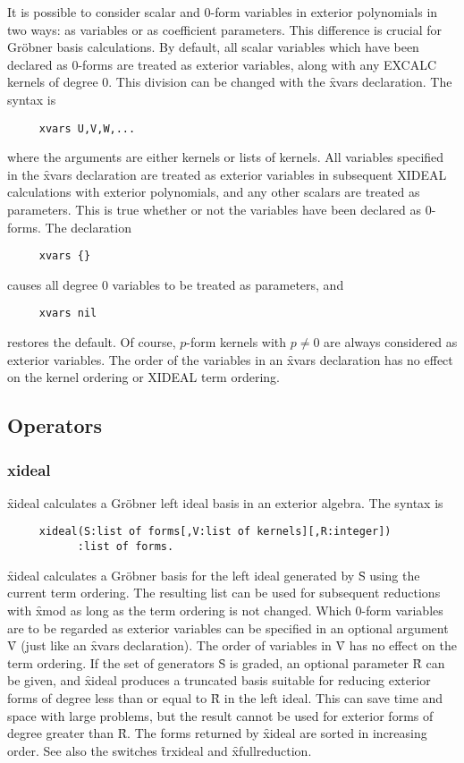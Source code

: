 It is possible to consider scalar and 0-form variables in exterior
polynomials in two ways: as variables or as coefficient parameters. This
difference is crucial for Gr{\"o}bner basis calculations. By default, all
scalar variables which have been declared as 0-forms are treated as
exterior variables, along with any EXCALC kernels of degree 0. This
division can be changed with the \f{xvars} declaration. The syntax is
\begin{verbatim}
     xvars U,V,W,...
\end{verbatim}
where the arguments are either kernels or lists of kernels. All variables
specified in the \f{xvars} declaration are treated as exterior variables in
subsequent XIDEAL calculations with exterior polynomials, and any other
scalars are treated as parameters. This is true whether or not the
variables have been declared as 0-forms. The declaration
\begin{verbatim}
     xvars {}
\end{verbatim}
causes all degree 0 variables to be treated as parameters, and
\begin{verbatim}
     xvars nil
\end{verbatim}
restores the default. Of course, $p$-form kernels with $p\not=0$ are always
considered as exterior variables. The order of the variables in an
\f{xvars} declaration has no effect on the \REDUCE{} kernel ordering or
XIDEAL term ordering.



\subsection{Operators}


\subsubsection*{xideal}

\f{xideal} calculates a Gr{\"o}bner left ideal basis in
an exterior algebra. The syntax is
\begin{verbatim}
     xideal(S:list of forms[,V:list of kernels][,R:integer])
           :list of forms.
\end{verbatim}
\f{xideal} calculates a Gr{\"o}bner basis for the left ideal generated by
\f{S} using the current term ordering. The resulting list can be used for
subsequent reductions with \f{xmod} as long as the term ordering is not
changed. Which 0-form variables are to be regarded as exterior variables
can be specified in an optional argument \f{V} (just like an \f{xvars}
declaration). The order of variables in \f{V} has no effect on the term
ordering. If the set of generators \f{S} is graded, an optional parameter
\f{R} can be given, and \f{xideal} produces a truncated basis suitable for
reducing exterior forms of degree less than or equal to \f{R} in the left
ideal. This can save time and space with large problems, but the result
cannot be used for exterior forms of degree greater than \f{R}. The forms
returned by \f{xideal} are sorted in increasing order. See also the
switches \f{trxideal} and \f{xfullreduction}.


